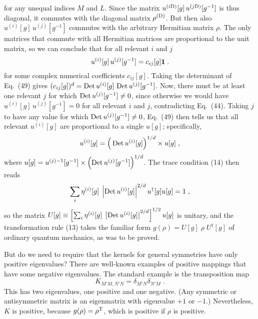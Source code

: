 \documentclass[12pt]{article}
\def\BM#1{\mbox{\boldmath{$#1$}}}
\begin{document}
for any unequal indices $M$ and $L$.
Since the matrix $u^{(i{\rm D})}[g]\,u^{(j{\rm D})}[g^{-1}]$ is thus diagonal, it commutes with 
the diagonal matrix $\rho^{(\rm D)}$.  But then also $u^{(i)}[g]\,u^{(j)}[g^{-1}]$ commutes with the arbitrary Hermitian matrix $\rho$.  The only matrices that commute with all Hermitian matrices are proportional to the unit matrix, so we can conclude that for all relevant $i$ and $j$
\begin{equation}
u^{(i)}[g]\,u^{(j)}[g^{-1}]=c_{ij}[g]{\BM 1}\;.
\end{equation}
for some complex numerical coefficients $c_{ij}[g]$.  Taking the determinant of Eq.~(49) gives $(c_{ij}[g])^d=\mathop{\rm Det}  
u^{(i)}[g]\,\mathop{\rm Det}u^{(j)}[g^{-1}]$.  Now, there must be at least one relevant $j$ for which $\mathop{\rm Det}u^{(j)}[g^{-1}] \neq 0$, since otherwise we would have $u^{(i)}[g]\,u^{(j)}[g^{-1}]=0$ for all relevant $i$ and $j$, contradicting Eq.~(44).  Taking $j$ to have any value for which $\mathop{\rm Det}u^{(j)}[g^{-1}] \neq 0$, Eq.~(49) then tells us that all relevant $u^{(i)}[g]$ are proportional to a single $u[g]$; specifically,
\begin{eqnarray}
u^{(i)}[g]=\Big(\mathop{\rm Det} u^{(i)}[g]\Big)^{1/d}\times u[g]\;,
\end{eqnarray}
where $u[g]=u^{(j)-1}[g^{-1}]\times \Big({\mathop {\rm Det}}\, u^{(j)}[g^{-1}]\Big)^{1/d}$.    The trace condition (14) then reads 
$$ \sum_i \eta^{(i)}[g]\;\left |\mathop{\rm Det} u^{(i)}[g]\right|^{2/d} u^\dagger[g]u[g]=1\;,$$
so the matrix  $U[g]\equiv \left[\sum_i \eta^{(i)}[g]\;\left |\mathop{\rm Det} u^{(i)}[g]\right|^{2/d}\right]^{1/2} u[g]$ is unitary, and the transformation rule (13) takes  the familiar form $g(\rho)=U[g]\;\rho\;U^{\dagger}[g]$ of ordinary quantum mechanics, as was to be proved.





But do we need to require that the kernels for general symmetries have only positive eigenvalues?  There are well-known examples of positive mappings that have some negative eigenvalues.  The standard example is the transposition map
$$K_{M'M,N'N}=\delta_{M'N}\delta_{N'M}\;.$$
This has two eigenvalues, one positive and one negative.  (Any symmetric or antisymmetric matrix is an eigenmatrix with eigenvalue $+1$ or $-1$.)  Nevertheless,  $K$ is positive, because $g(\rho)=\rho^{\rm T}$, which is positive if $\rho$ is positive.  
\end{document}
